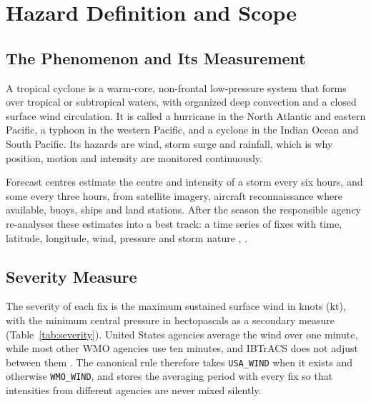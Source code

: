 \documentclass[10pt,twocolumn,letterpaper]{article}
\newcommand{\code}[1]{\texttt{\footnotesize #1}}
\begin{document}
\section{Hazard Definition and Scope}\label{sec:hazard}

\subsection{The Phenomenon and Its Measurement}
A tropical cyclone is a warm-core, non-frontal low-pressure system that forms over tropical or subtropical waters, with organized deep convection and a closed surface wind circulation. It is called a hurricane in the North Atlantic and eastern Pacific, a typhoon in the western Pacific, and a cyclone in the Indian Ocean and South Pacific. Its hazards are wind, storm surge and rainfall, which is why position, motion and intensity are monitored continuously.

Forecast centres estimate the centre and intensity of a storm every six hours, and some every three hours, from satellite imagery, aircraft reconnaissance where available, buoys, ships and land stations. After the season the responsible agency re-analyses these estimates into a best track: a time series of fixes with time, latitude, longitude, wind, pressure and storm nature \cite{ibtracs-paper}, \cite{ibtracs-tech}.

\subsection{Severity Measure}
The severity of each fix is the maximum sustained surface wind in knots (kt), with the minimum central pressure in hectopascals as a secondary measure (Table~\ref{tab:severity}). United States agencies average the wind over one minute, while most other WMO agencies use ten minutes, and IBTrACS does not adjust between them \cite{ibtracs-cols}. The canonical rule therefore takes \code{USA\_WIND} when it exists and otherwise \code{WMO\_WIND}, and stores the averaging period with every fix so that intensities from different agencies are never mixed silently.
\end{document}
